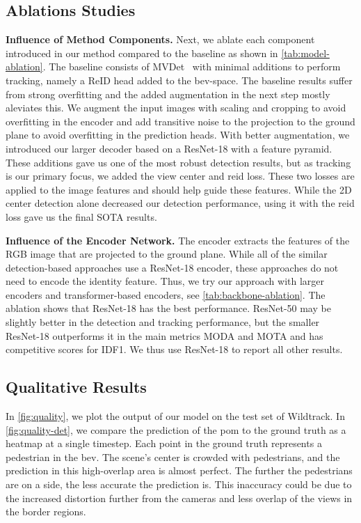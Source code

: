 \documentclass[10pt,twocolumn,letterpaper]{article}
\newcommand{\nparagraph}[1]{\noindent\textbf{#1.  }}
\begin{document}
{\subsection{Ablations Studies}
\nparagraph{Influence of Method Components}
Next, we ablate each component introduced in our method compared to the baseline as shown in \cref{tab:model-ablation}. The baseline consists of MVDet~\cite{hou2020multiview} with minimal additions to perform tracking, namely a ReID head added to the \gls{bev}-space. The baseline results suffer from strong overfitting and the added augmentation in the next step mostly aleviates this. We augment the input images with scaling and cropping to avoid overfitting in the encoder and add transitive noise to the projection to the ground plane to avoid overfitting in the prediction heads. With better augmentation, we introduced our larger decoder based on a ResNet-18 with a feature pyramid. These additions gave us one of the most robust detection results, but as tracking is our primary focus, we added the view center and \gls{reid} loss. These two losses are applied to the image features and should help guide these features. While the 2D center detection alone decreased our detection performance, using it with the \gls{reid} loss gave us the final SOTA results.

\nparagraph{Influence of the Encoder Network} The encoder extracts the features of the RGB image that are projected to the ground plane. While all of the similar detection-based approaches \cite{hou2020multiview, hou2021multiview, lee2023multi, qiu20223d} use a ResNet-18 encoder, these approaches do not need to encode the identity feature. Thus, we try our approach with larger encoders and transformer-based encoders, see \cref{tab:backbone-ablation}. The ablation shows that ResNet-18 has the best performance. ResNet-50 may be slightly better in the detection and tracking performance, but the smaller ResNet-18 outperforms it in the main metrics MODA and MOTA and has competitive scores for IDF1. We thus use ResNet-18 to report all other results.




\subsection{Qualitative Results}
In \cref{fig:quality}, we plot the output of our model on the test set of Wildtrack. In \cref{fig:quality-det}, we compare the prediction of the \gls{pom} to the ground truth as a heatmap at a single timestep. Each point in the ground truth represents a pedestrian in the \gls{bev}. The scene's center is crowded with pedestrians, and the prediction in this high-overlap area is almost perfect. The further the pedestrians are on a side, the less accurate the prediction is. This inaccuracy could be due to the increased distortion further from the cameras and less overlap of the views in the border regions. 

}
\end{document}
